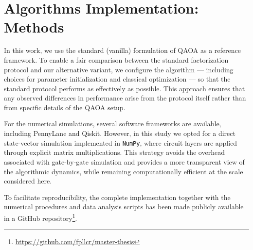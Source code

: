 
\section{Algorithms Implementation: Methods}

In this work, we use the standard (vanilla) formulation of QAOA as a reference framework. To enable a fair comparison between the standard factorization protocol and our alternative variant, we configure the algorithm --- including choices for parameter initialization and classical optimization --- so that the standard protocol performs as effectively as possible. This approach ensures that any observed differences in performance arise from the protocol itself rather than from specific details of the QAOA setup.

For the numerical simulations, several software frameworks are available, including PennyLane and Qiskit. However, in this study we opted for a direct state-vector simulation implemented in \texttt{NumPy}, where circuit layers are applied through explicit matrix multiplications. This strategy avoids the overhead associated with gate-by-gate simulation and provides a more transparent view of the algorithmic dynamics, while remaining computationally efficient at the scale considered here.

To facilitate reproducibility, the complete implementation together with the numerical procedures and data analysis scripts has been made publicly available in a GitHub repository\footnote{\url{https://github.com/fpllcr/master-thesis}}.
